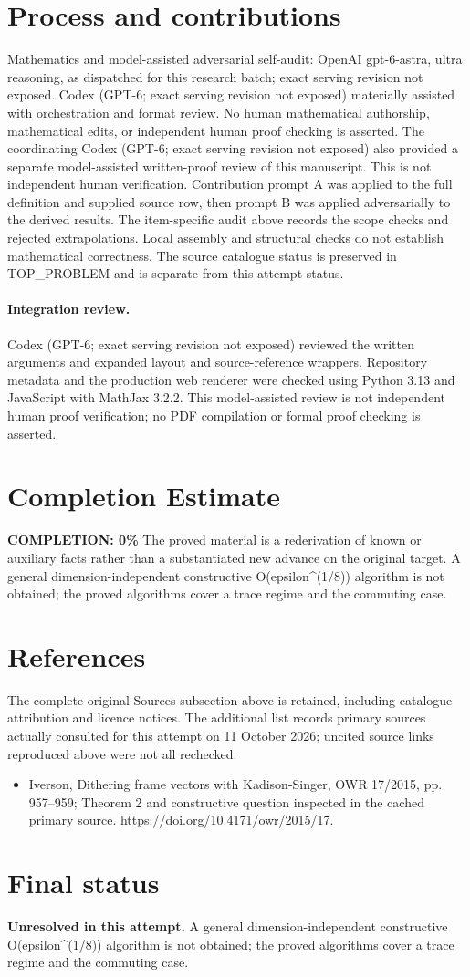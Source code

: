 \documentclass[11pt]{article}
\begin{document}
\section{Process and contributions}
Mathematics and model-assisted adversarial self-audit: OpenAI gpt-6-astra, ultra reasoning, as dispatched for this research batch; exact serving revision not exposed. Codex (GPT-6; exact serving revision not exposed) materially assisted with orchestration and format review. No human mathematical authorship, mathematical edits, or independent human proof checking is asserted.
The coordinating Codex (GPT-6; exact serving revision not exposed) also provided a separate model-assisted written-proof review of this manuscript. This is not independent human verification.
Contribution prompt A was applied to the full definition and supplied source row, then prompt B was applied adversarially to the derived results. The item-specific audit above records the scope checks and rejected extrapolations. Local assembly and structural checks do not establish mathematical correctness. The source catalogue status is preserved in TOP\_PROBLEM and is separate from this attempt status.
\paragraph{Integration review.} Codex (GPT-6; exact serving revision not exposed) reviewed the written arguments and expanded layout and source-reference wrappers. Repository metadata and the production web renderer were checked using Python 3.13 and JavaScript with MathJax 3.2.2. This model-assisted review is not independent human proof verification; no PDF compilation or formal proof checking is asserted.

\section{Completion Estimate}
\noindent\textbf{COMPLETION: 0\%}
The proved material is a rederivation of known or auxiliary facts rather than a substantiated new advance on the original target. A general dimension-independent constructive O(epsilon^(1/8)) algorithm is not obtained; the proved algorithms cover a trace regime and the commuting case.
\section{References}
The complete original Sources subsection above is retained, including catalogue attribution and licence notices. The additional list records primary sources actually consulted for this attempt on 11 October 2026; uncited source links reproduced above were not all rechecked.
\begin{itemize}
\item Iverson, Dithering frame vectors with Kadison-Singer, OWR 17/2015, pp. 957--959; Theorem 2 and constructive question inspected in the cached primary source. \url{https://doi.org/10.4171/owr/2015/17}.
\end{itemize}
\section{Final status}
\textbf{Unresolved in this attempt.} A general dimension-independent constructive O(epsilon^(1/8)) algorithm is not obtained; the proved algorithms cover a trace regime and the commuting case.
\end{document}
